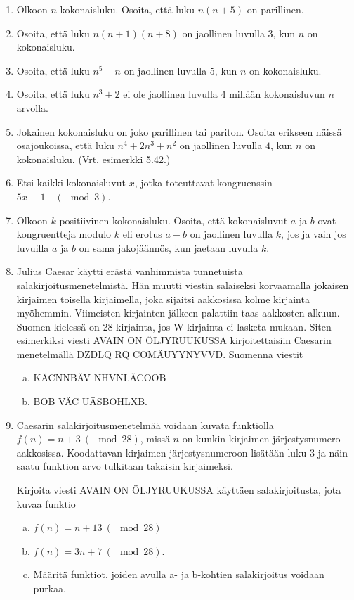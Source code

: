 \begin{enumerate}
\item Olkoon $n$ kokonaisluku. Osoita, että luku $n(n + 5)$ on parillinen.

\item Osoita, että luku $n(n + 1)(n + 8)$ on jaollinen luvulla 3, kun $n$ on kokonaisluku.

\item Osoita, että luku $n^5 - n$ on jaollinen luvulla 5, kun $n$ on kokonaisluku.

\item Osoita, että luku $n^3 + 2$ ei ole jaollinen luvulla 4 millään kokonaisluvun $n$ arvolla.

\item Jokainen kokonaisluku on joko parillinen tai pariton. Osoita erikseen näissä osajoukoissa, että luku $n^4 + 2n^3 + n^2$ on jaollinen luvulla $4$, kun $n$ on kokonaisluku. (Vrt. esimerkki 5.42.)

\item
Etsi kaikki kokonaisluvut $x$, jotka toteuttavat kongruenssin $5x\equiv 1 \quad (\mod 3)$.

\item
Olkoon $k$ positiivinen kokonaisluku. Osoita, että kokonaisluvut $a$ ja $b$ ovat kongruentteja modulo $k$ eli erotus $a-b$ on jaollinen luvulla $k$, jos ja vain jos luvuilla $a$ ja $b$ on sama jakojäännös, kun jaetaan luvulla $k$.

\item Julius Caesar käytti erästä vanhimmista tunnetuista salakirjoitusmenetelmistä. Hän muutti viestin salaiseksi korvaamalla jokaisen kirjaimen toisella kirjaimella, joka sijaitsi aakkosissa kolme kirjainta myöhemmin. Viimeisten kirjainten jälkeen palattiin taas aakkosten alkuun. Suomen kielessä on 28 kirjainta, jos W-kirjainta ei lasketa mukaan. Siten esimerkiksi viesti AVAIN ON ÖLJYRUUKUSSA kirjoitettaisiin Caesarin menetelmällä DZDLQ RQ COMÄUYYNYVVD. Suomenna viestit 
\begin{enumerate}[a)]
\item KÄCNNBÄV NHVNLÄCOOB
\item BOB VÄC UÄSBOHLXB.
\end{enumerate}

\item Caesarin salakirjoitusmenetelmää voidaan kuvata funktiolla $f(n) = n + 3 \ (\mod 28)$, missä $n$ on kunkin kirjaimen järjestysnumero aakkosissa. Koodattavan kirjaimen järjestysnumeroon lisätään luku $3$ ja näin saatu funktion arvo tulkitaan takaisin kirjaimeksi. 

Kirjoita viesti AVAIN ON ÖLJYRUUKUSSA käyttäen salakirjoitusta, jota kuvaa funktio 
\begin{enumerate}[a)]
\item $f(n) = n + 13 \ (\mod 28)$
\item $f(n) = 3n + 7 \ (\mod 28)$.
\item Määritä funktiot, joiden avulla a- ja b-kohtien salakirjoitus voidaan purkaa.
\end{enumerate}

\end{enumerate}

